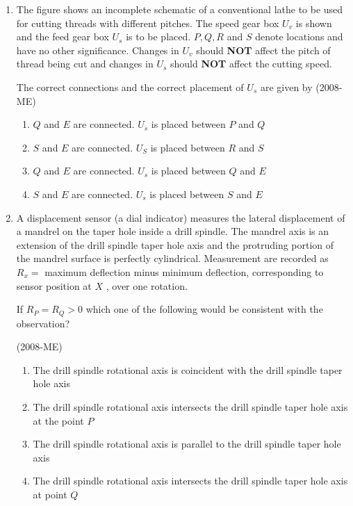 \documentclass[journal]{IEEEtran}
\begin{document}
\begin{enumerate}
    \item The figure shows an incomplete schematic of a conventional lathe to be used for cutting threads with different pitches. The speed gear box $U_v$
 is shown and the feed gear box $U_s$
 is to be placed. $P, Q, R$
 and $S$
 denote locations and have no other significance. Changes in $U_v$
 should \textbf{NOT}
 affect the pitch of thread being cut and changes in $U_s$
 should \textbf{NOT} affect the cutting speed. 
 
 The correct connections and the correct placement of $U_s$
 are given by \hfill(2008-ME)
 \begin{enumerate}
         \item $Q$ and $E$ are connected. $U_s$ is placed between $P$ and $Q$
         \item $S$ and $E$ are connected. $U_S$ is placed between $R$ and $S$
         \item $Q$ and $E$ are connected. $U_s$ is placed between $Q$ and $E$
         \item $S$ and $E$ are connected. $U_s$ is placed between $S$ and $E$
 \end{enumerate}
 \item A displacement sensor (a dial indicator) measures the lateral displacement of a mandrel on the taper hole inside a drill spindle. The mandrel axis is an extension of the drill spindle taper hole axis and the protruding portion of the mandrel surface is perfectly cylindrical. Measurement are recorded as $R_x = $
 maximum deflection minus minimum deflection, corresponding to sensor position at $X$
, over one rotation.

If $R_P = R_Q > 0$
 which one of the following would be consistent with the observation? 

 \hfill(2008-ME)
 \begin{enumerate}
     \item The drill spindle rotational axis is coincident with the drill spindle taper hole axis 
     \item The drill spindle rotational axis intersects the drill spindle taper hole axis at the point $P$
     \item The drill spindle rotational axis is parallel to the drill spindle taper hole axis 
     \item The drill spindle rotational axis intersects the drill spindle taper hole axis at point $Q$
 \end{enumerate}


\end{enumerate}
\end{document}

